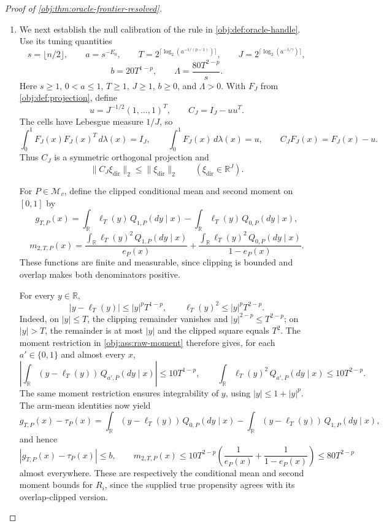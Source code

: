 \documentclass[11pt]{article}
\begin{document}
\begin{proof}[Proof of \cref{obj:thm:oracle-frontier-resolved}]
\begin{enumerate}
\item We next establish the null calibration of the rule in \cref{obj:def:oracle-handle}. Use its tuning quantities
\[
s=\lfloor n/2\rfloor,\qquad a=s^{-E_0},\qquad
T=2^{\lceil\log_2(a^{-1/(p-1)})\rceil},\qquad
J=2^{\lceil\log_2(a^{-1/\gamma})\rceil},
\]
\[
b=20T^{1-p},\qquad
\Lambda=\frac{80T^{2-p}}s.
\]
Here \(s\ge1\), \(0<a\le1\), \(T\ge1\), \(J\ge1\), \(b\ge0\), and \(\Lambda>0\).
With \(F_J\) from \cref{obj:def:projection}, define
\[
u=J^{-1/2}(1,\ldots,1)^T,\qquad
C_J=I_J-uu^T.
\]
The cells have Lebesgue measure \(1/J\), so
\[
\int_0^1F_J(x)F_J(x)^T\,d\lambda(x)=I_J,
\qquad
\int_0^1F_J(x)\,d\lambda(x)=u,
\qquad
C_JF_J(x)=F_J(x)-u.
\]
Thus \(C_J\) is a symmetric orthogonal projection and
\[
\|C_J\xi_{\mathrm{dir}}\|_2\le\|\xi_{\mathrm{dir}}\|_2
\qquad(\xi_{\mathrm{dir}}\in\mathbb R^J).
\]

For \(P\in\mathcal M_v\), define the clipped conditional mean and second moment on \([0,1]\) by
\[
g_{T,P}(x)
=\int_{\mathbb R}\ell_T(y)\,Q_{1,P}(dy\mid x)
-\int_{\mathbb R}\ell_T(y)\,Q_{0,P}(dy\mid x),
\]
\[
m_{2,T,P}(x)
=\frac{\int_{\mathbb R}\ell_T(y)^2\,Q_{1,P}(dy\mid x)}{e_P(x)}
+\frac{\int_{\mathbb R}\ell_T(y)^2\,Q_{0,P}(dy\mid x)}{1-e_P(x)}.
\]
These functions are finite and measurable, since clipping is bounded and overlap makes both denominators positive.

For every \(y\in\mathbb R\),
\[
|y-\ell_T(y)|\le |y|^pT^{1-p},
\qquad
\ell_T(y)^2\le |y|^pT^{2-p}.
\]
Indeed, on \(|y|\le T\), the clipping remainder vanishes and
\(|y|^{2-p}\le T^{2-p}\); on \(|y|>T\), the remainder is at most \(|y|\) and the clipped square equals \(T^2\). The moment restriction in \cref{obj:ass:raw-moment} therefore gives, for each \(a'\in\{0,1\}\) and almost every \(x\),
\[
\left|\int_{\mathbb R}(y-\ell_T(y))\,Q_{a',P}(dy\mid x)\right|
\le10T^{1-p},
\qquad
\int_{\mathbb R}\ell_T(y)^2\,Q_{a',P}(dy\mid x)
\le10T^{2-p}.
\]
The same moment restriction ensures integrability of \(y\), using
\(|y|\le1+|y|^p\).
The arm-mean identities now yield
\[
g_{T,P}(x)-\tau_P(x)
=
\int_{\mathbb R}(y-\ell_T(y))\,Q_{0,P}(dy\mid x)
-\int_{\mathbb R}(y-\ell_T(y))\,Q_{1,P}(dy\mid x),
\]
and hence
\[
|g_{T,P}(x)-\tau_P(x)|\le b,
\qquad
m_{2,T,P}(x)
\le10T^{2-p}
\left(\frac1{e_P(x)}+\frac1{1-e_P(x)}\right)
\le80T^{2-p}
\]
almost everywhere. These are respectively the conditional mean and second moment bounds for \(R_i\), since the supplied true propensity agrees with its overlap-clipped version.


\end{enumerate}
\end{proof}
\end{document}
